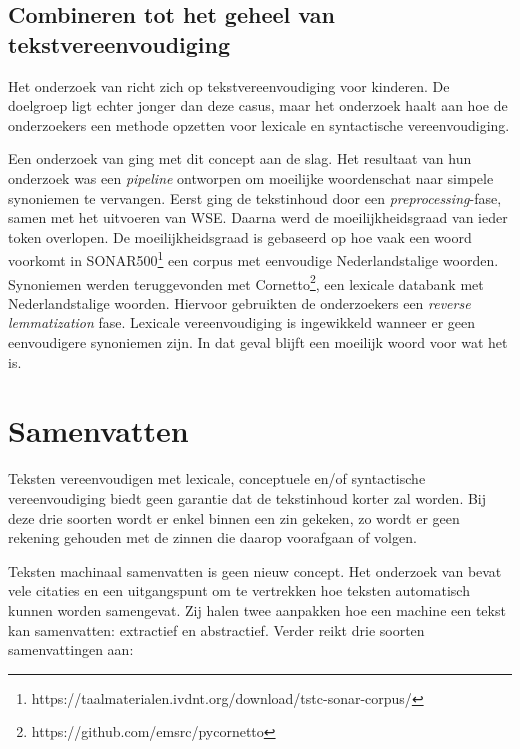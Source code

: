 \subsection{Combineren tot het geheel van tekstvereenvoudiging}

Het onderzoek van \textcite{DeBelder2010} richt zich op tekstvereenvoudiging voor kinderen. De doelgroep ligt echter jonger dan deze casus, maar het onderzoek haalt aan hoe de onderzoekers een methode opzetten voor lexicale en syntactische vereenvoudiging.

Een onderzoek van \textcite{Bulte2018} ging met dit concept aan de slag. Het resultaat van hun onderzoek was een \textit{pipeline} ontworpen om moeilijke woordenschat naar simpele synoniemen te vervangen. Eerst ging de tekstinhoud door een \textit{preprocessing}-fase, samen met het uitvoeren van WSE. Daarna werd de moeilijkheidsgraad van ieder token overlopen. De moeilijkheidsgraad is gebaseerd op hoe vaak een woord voorkomt in SONAR500\footnote{https://taalmaterialen.ivdnt.org/download/tstc-sonar-corpus/} een corpus met eenvoudige Nederlandstalige woorden. Synoniemen werden teruggevonden met Cornetto\footnote{https://github.com/emsrc/pycornetto}, een lexicale databank met Nederlandstalige woorden. Hiervoor gebruikten de onderzoekers een \textit{reverse lemmatization} fase. Lexicale vereenvoudiging is ingewikkeld wanneer er geen eenvoudigere synoniemen zijn. In dat geval blijft een moeilijk woord voor wat het is.

\section{Samenvatten}


Teksten vereenvoudigen met lexicale, conceptuele en/of syntactische vereenvoudiging biedt geen garantie dat de tekstinhoud korter zal worden. Bij deze drie soorten wordt er enkel binnen een zin gekeken, zo wordt er geen rekening gehouden met de zinnen die daarop voorafgaan of volgen.




Teksten machinaal samenvatten is geen nieuw concept. Het onderzoek van \textcite{Hahn2000} bevat vele citaties en een uitgangspunt om te vertrekken hoe teksten automatisch kunnen worden samengevat. Zij halen twee aanpakken hoe een machine een tekst kan samenvatten: extractief en abstractief. Verder reikt \textcite{Hahn2000} drie soorten samenvattingen aan:

